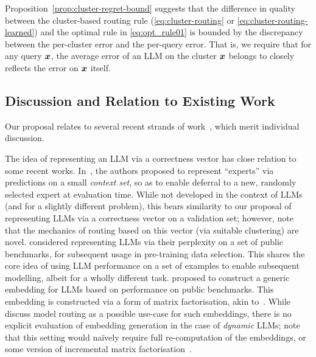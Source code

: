 Proposition~\ref{prop:cluster-regret-bound} suggests that the difference in quality between the cluster-based routing rule  (\eqref{eq:cluster-routing} or \eqref{eq:cluster-routing-learned}) and the optimal rule in \eqref{eq:opt_rule01} is bounded by the discrepancy between the per-cluster error and the per-query error.
That is, 
we require that %
for any query $\boldsymbol{x}$, 
the average error of an LLM on the cluster $\boldsymbol{x}$ belongs to closely reflects the error on $\boldsymbol{x}$ itself. %


\subsection{Discussion and Relation to Existing Work}
\label{sec:discussion_related}

Our proposal relates to several recent strands of work~\citep{Tailor:2024,Thrush:2024,ZhuWuWen2024,Feng:2024,Li:2025,Zhao:2024}, which merit individual discussion.

The idea of representing an LLM via a correctness vector has close relation to some recent works.
In~\citet{Tailor:2024}, the authors proposed to represent ``experts'' via predictions on a small \emph{context set},
so as to enable deferral to a new, randomly selected expert at evaluation time.
While not developed in the context of LLMs (and for a slightly different problem),
this bears similarity to our proposal of representing LLMs via a correctness vector on a validation set; 
however, note that the mechanics of routing based on this vector (via suitable clustering) are novel.
\citet{Thrush:2024} considered representing LLMs via their perplexity on a set of public benchmarks,
for subsequent usage in pre-training data selection.
This shares the core idea of using LLM performance on a set of examples to enable subsequent modelling, albeit for a wholly different task.
\citet{ZhuWuWen2024} proposed to construct a generic
embedding for LLMs based on performance on public benchmarks.
This embedding is constructed via a form of matrix factorisation, akin to~\citet{OngAlmWu2024}.
While~\citet{ZhuWuWen2024} discuss model routing as a possible use-case for such embeddings, there is no explicit evaluation of embedding generation in the case of \emph{dynamic} LLMs;
note that this setting would na\"{i}vely require full re-computation of the embeddings, or some version of incremental matrix factorisation~\citep{Brand:2002}.

